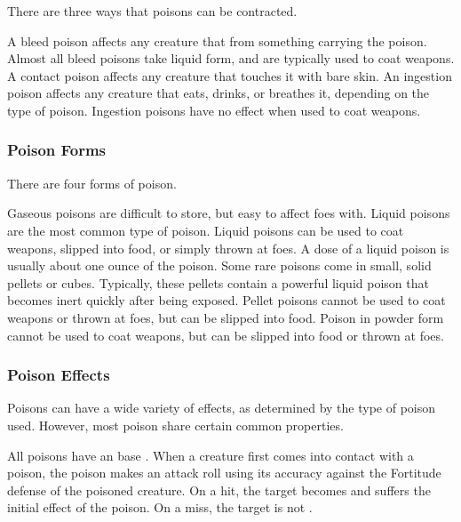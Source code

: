             There are three ways that poisons can be contracted.

             A bleed poison affects any creature that  from something carrying the poison.
            Almost all bleed poisons take liquid form, and are typically used to coat weapons.
             A contact poison affects any creature that touches it with bare skin.
             An ingestion poison affects any creature that eats, drinks, or breathes it, depending on the type of poison.
            Ingestion poisons have no effect when used to coat weapons.

        \subsubsection{Poison Forms}\label{Poison Forms}

            There are four forms of poison.

             Gaseous poisons are difficult to store, but easy to affect foes with.
             Liquid poisons are the most common type of poison.
            Liquid poisons can be used to coat weapons, slipped into food, or simply thrown at foes.
            A dose of a liquid poison is usually about one ounce of the poison.
             Some rare poisons come in small, solid pellets or cubes.
            Typically, these pellets contain a powerful liquid poison that becomes inert quickly after being exposed.
            Pellet poisons cannot be used to coat weapons or thrown at foes, but can be slipped into food.
             Poison in powder form cannot be used to coat weapons, but can be slipped into food or thrown at foes.

        \subsubsection{Poison Effects}\label{Poison Effects}

            Poisons can have a wide variety of effects, as determined by the type of poison used.
            However, most poison share certain common properties.

            All poisons have an base .
            When a creature first comes into contact with a poison, the poison makes an attack roll using its accuracy against the Fortitude defense of the poisoned creature.
            On a hit, the target becomes  and suffers the initial effect of the poison.
            On a miss, the target is not .

